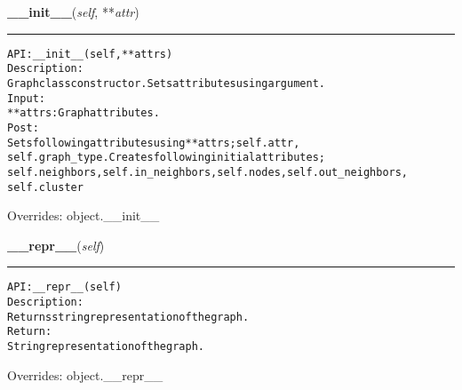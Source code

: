 \hspace{.8\funcindent}\begin{boxedminipage}{\funcwidth}

    \raggedright \textbf{\_\_init\_\_}(\textit{self}, **\textit{attr})

    \vspace{-1.5ex}

    \rule{\textwidth}{0.5\fboxrule}
\setlength{\parskip}{2ex}
\begin{alltt}

API: \_\_init\_\_(self, **attrs)
Description:
Graph class constructor. Sets attributes using argument.
Input:
    **attrs: Graph attributes.
Post:
    Sets following attributes using **attrs; self.attr,
    self.graph\_type. Creates following initial attributes;
    self.neighbors, self.in\_neighbors, self.nodes, self.out\_neighbors,
    self.cluster
\end{alltt}

\setlength{\parskip}{1ex}
      Overrides: object.\_\_init\_\_

    \end{boxedminipage}

    \vspace{0.5ex}

\hspace{.8\funcindent}\begin{boxedminipage}{\funcwidth}

    \raggedright \textbf{\_\_repr\_\_}(\textit{self})

    \vspace{-1.5ex}

    \rule{\textwidth}{0.5\fboxrule}
\setlength{\parskip}{2ex}
\begin{alltt}

API: \_\_repr\_\_(self)
Description:
Returns string representation of the graph.
Return:
    String representation of the graph.
\end{alltt}

\setlength{\parskip}{1ex}
      Overrides: object.\_\_repr\_\_

    \end{boxedminipage}

    \label{coinor:gimpy:graph:Graph:add_edge}

    \vspace{0.5ex}

